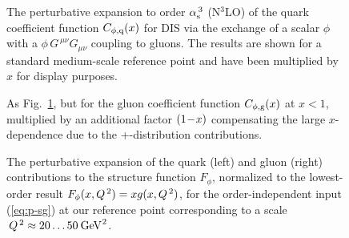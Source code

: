 \documentclass[12pt]{article}
\newcommand{\as}{\alpha_{\rm s}}
\begin{document}
\begin{figure}[p]
\vspace*{-1mm}
\centerline{}
\vspace{-2mm}
\caption{\label{pic:fig1}
 The perturbative expansion to order $\as^{\,3}$ (N$^3$LO) of the quark 
 coefficient function $C_{\rm \phi, q}(x)$ for DIS via the exchange of a scalar
 $\phi$ with a $\phi\, G^{\,\mu\nu} G_{\mu\nu}$ coupling to gluons. The results
 are shown for a standard medium-scale reference point and have been multiplied
 by $x$ for display purposes.
 }
\end{figure}
%
\begin{figure}[p]
\centerline{}
\vspace{-2mm}
\caption{\label{pic:fig2}
 As Fig.~\ref{pic:fig1}, but for the gluon coefficient function 
 $C_{\rm \phi, g}(x)$ at $x < \!1$, multiplied by an additional factor $\x1$
 compensating the large $x$-dependence due to the +-distribution contributions. 
 }
\vspace{-1mm}
\end{figure}

\begin{figure}[thb]
\vspace*{-2mm}
\centerline{}
\vspace{-3mm}
\caption{\label{pic:fig3}
 The perturbative expansion of the quark (left) and gluon (right) contributions
 to the structure function $F_\phi$, normalized to the lowest-order result
 $F_\phi(x,{Q^{\, 2}}) = x g(x,{Q^{\, 2}})$, for the order-independent input (\ref{eq:p-sg}) 
 at our reference point corresponding to a scale $\,\Qs \approx 20 \ldots 50\: 
 \GeV2$.
\vspace{1mm}
 }
\end{figure}
\end{document}
